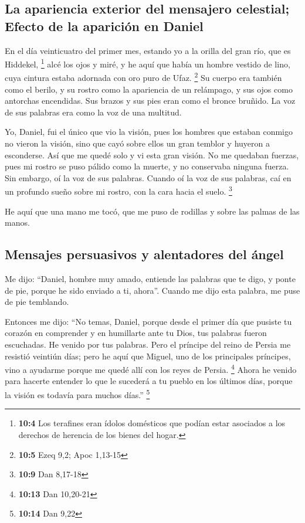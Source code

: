 \hypertarget{la-apariencia-exterior-del-mensajero-celestial-efecto-de-la-apariciuxf3n-en-daniel}{%
\subsection{La apariencia exterior del mensajero celestial; Efecto de la
aparición en
Daniel}\label{la-apariencia-exterior-del-mensajero-celestial-efecto-de-la-apariciuxf3n-en-daniel}}

 En el día veinticuatro del primer mes, estando yo a la
orilla del gran río, que es Hiddekel, \footnote{\textbf{10:4} Los
  terafines eran ídolos domésticos que podían estar asociados a los
  derechos de herencia de los bienes del hogar.}  alcé los
ojos y miré, y he aquí que había un hombre vestido de lino, cuya cintura
estaba adornada con oro puro de Ufaz. \footnote{\textbf{10:5} Ezeq 9,2;
  Apoc 1,13-15}  Su cuerpo era también como el berilo, y
su rostro como la apariencia de un relámpago, y sus ojos como antorchas
encendidas. Sus brazos y sus pies eran como el bronce bruñido. La voz de
sus palabras era como la voz de una multitud.

 Yo, Daniel, fui el único que vio la visión, pues los
hombres que estaban conmigo no vieron la visión, sino que cayó sobre
ellos un gran temblor y huyeron a esconderse.  Así que me
quedé solo y vi esta gran visión. No me quedaban fuerzas, pues mi rostro
se puso pálido como la muerte, y no conservaba ninguna fuerza.
 Sin embargo, oí la voz de sus palabras. Cuando oí la voz
de sus palabras, caí en un profundo sueño sobre mi rostro, con la cara
hacia el suelo. \footnote{\textbf{10:9} Dan 8,17-18}

 He aquí que una mano me tocó, que me puso de rodillas y
sobre las palmas de las manos.

\hypertarget{mensajes-persuasivos-y-alentadores-del-uxe1ngel}{%
\subsection{Mensajes persuasivos y alentadores del
ángel}\label{mensajes-persuasivos-y-alentadores-del-uxe1ngel}}

 Me dijo: ``Daniel, hombre muy amado, entiende las
palabras que te digo, y ponte de pie, porque he sido enviado a ti,
ahora''. Cuando me dijo esta palabra, me puse de pie temblando.

 Entonces me dijo: ``No temas, Daniel, porque desde el
primer día que pusiste tu corazón en comprender y en humillarte ante tu
Dios, tus palabras fueron escuchadas. He venido por tus palabras.
 Pero el príncipe del reino de Persia me resistió
veintiún días; pero he aquí que Miguel, uno de los principales
príncipes, vino a ayudarme porque me quedé allí con los reyes de Persia.
\footnote{\textbf{10:13} Dan 10,20-21}  Ahora he venido
para hacerte entender lo que le sucederá a tu pueblo en los últimos
días, porque la visión es todavía para muchos días.'' \footnote{\textbf{10:14}
  Dan 9,22}

